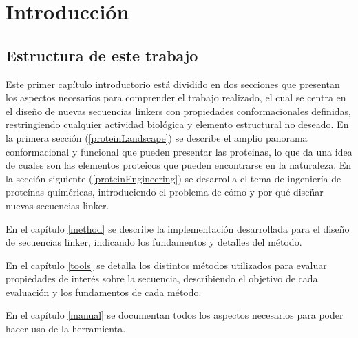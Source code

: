 \chapter{Introducci\'on}



\section{Estructura de este trabajo}

Este primer capítulo introductorio está dividido en dos secciones que presentan los aspectos necesarios para comprender el trabajo realizado, el cual se centra en el diseño de nuevas secuencias linkers 
con propiedades conformacionales definidas, restringiendo cualquier actividad biológica y elemento estructural no deseado.
En la primera sección (\ref{proteinLandscape}) se describe el amplio panorama conformacional y funcional que pueden presentar las proteinas, lo que da una idea de cuales son las elementos proteicos que pueden encontrarse en la naturaleza.
En la sección siguiente (\ref{proteinEngineering}) se desarrolla el tema de ingeniería de proteínas quiméricas, introduciendo el problema de cómo y por qué diseñar nuevas secuencias linker.

En el capítulo \ref{method} se describe la implementación desarrollada para el diseño de secuencias linker, indicando los fundamentos y detalles del método.

En el capítulo \ref{tools} se detalla los distintos métodos utilizados para evaluar propiedades de interés sobre la secuencia, describiendo el objetivo de cada evaluación y los fundamentos de cada método. 

En el capítulo \ref{manual} se documentan todos los aspectos necesarios para poder hacer uso de la herramienta.

